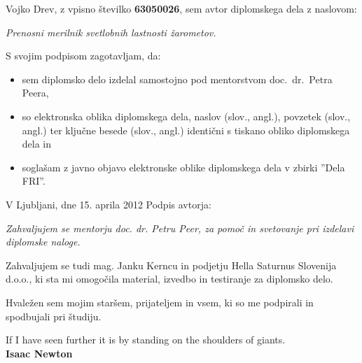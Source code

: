 \documentclass[oneside, a4paper, 12pt]{book}
\newcommand{\clearemptydoublepage}{\newpage{\pagestyle{empty}\cleardoublepage}}
\begin{document}
\vspace{1cm}
\noindent Vojko Drev,
z vpisno številko \textbf{63050026}, sem avtor  diplomskega dela z naslovom:
   
\vspace{0.5cm}
\emph{Prenosni merilnik svetlobnih lastnosti žarometov.}

\vspace{1.5cm}
\noindent S svojim podpisom zagotavljam, da:
\begin{itemize}
	\item sem diplomsko delo izdelal samostojno pod mentorstvom 
		doc.\ dr.\ Petra Peera,

	\item	so elektronska oblika diplomskega dela, naslov (slov., angl.), povzetek (slov., angl.) ter ključne besede (slov., angl.) identični s tiskano obliko diplomskega dela in
	\item soglašam z javno objavo elektronske oblike diplomskega dela v zbirki ''Dela FRI''.
\end{itemize}

\vspace{1cm}
\noindent V Ljubljani, dne 15. aprila 2012 \hfill Podpis avtorja:

\clearemptydoublepage

\thispagestyle{empty}\mbox{}\vfill\null\it%
Zahvaljujem se mentorju doc. dr. Petru Peer, za pomoč in svetovanje pri izdelavi diplomske naloge.

Zahvaljujem se tudi mag. Janku Kerncu in podjetju Hella Saturnus Slovenija d.o.o., ki sta mi omogočila material, izvedbo in testiranje za diplomsko delo.

Hvaležen sem mojim staršem, prijateljem in vsem, ki so me podpirali in spodbujali pri študiju.
\rm\normalfont

\clearemptydoublepage

\thispagestyle{empty}\mbox{}{\textheight}\mbox{}\hfill\begin{minipage}{0.90\textwidth}%
\begin{flushright}
If I have seen further it is by standing on the shoulders of giants.\\
\textbf{Isaac Newton}
\end{flushright}
\normalfont\end{minipage}
 
\clearemptydoublepage
\end{document}
